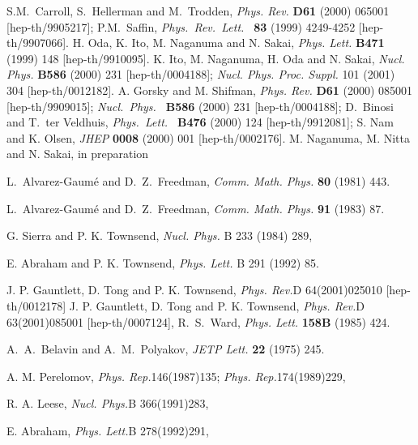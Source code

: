 \documentclass[a4paper,12pt]{article}
\begin{document}
\begin{thebibliography}{100}
              S.M.~Carroll, S.~Hellerman and M.~Trodden, 
              {\em Phys. Rev.} {\bf D61} (2000) 065001 
              [hep-th/9905217];
              P.M.~Saffin, {\it Phys.\ Rev.\ Lett.\ } {\bf 83} (1999) 
              4249-4252 [hep-th/9907066]. 
H. Oda, K. Ito, M. Naganuma and N. Sakai, 
              {\em Phys. Lett.} {\bf B471} (1999) 148 
              [hep-th/9910095]. 
 K. Ito, M. Naganuma, H. Oda and N. Sakai, 
              {\em Nucl. Phys.} {\bf B586} (2000) 231 
              [hep-th/0004188]; 
             {\em Nucl. Phys. Proc. Suppl.} {101} (2001) 304 
               [hep-th/0012182].
 A. Gorsky and M. Shifman, 
              {\em Phys. Rev.} {\bf D61} 
              (2000) 085001 [hep-th/9909015];
             {\it Nucl.\ Phys.\ } {\bf B586} (2000) 231 
             [hep-th/0004188];
             D.~Binosi and T.~ter Veldhuis, 
             {\it Phys.\ Lett.\ } {\bf B476} (2000) 124 
             [hep-th/9912081];
             S. Nam and K. Olsen, {\em JHEP} {\bf 0008} 
             (2000) 001 [hep-th/0002176].
%
%
  M. Naganuma, M. Nitta and N. Sakai, 
            in preparation

L.~Alvarez-Gaum\'{e} and D.~Z.~Freedman, 
{\em Comm. Math. Phys.} {\bf 80} (1981) 443.

L.~Alvarez-Gaum\'{e} and D.~Z.~Freedman, 
{\em Comm. Math. Phys.} {\bf 91} (1983) 87.

 G. Sierra and P. K. Townsend,
           {\em Nucl. Phys.} {B 233} (1984) 289,
 
E. Abraham and P. K. Townsend, 
{\em Phys. Lett.} {B 291} (1992) 85.
 
J. P. Gauntlett, D. Tong and P. K. Townsend,
              {\em Phys. Rev.}{D 64}(2001)025010
               [hep-th/0012178]
J. P. Gauntlett, D. Tong and P. K. Townsend,
               {\em Phys. Rev.}{D 63}(2001)085001 
               [hep-th/0007124],
R.~S.~Ward, 
{\em Phys. Lett. } {\bf 158B} (1985) 424.

A.~A.~Belavin and A.~M.~Polyakov, 
{\em JETP Lett.} {\bf 22} (1975) 245. 

A. M. Perelomov,
               {\em Phys. Rep.}{146}(1987)135; 
               {\em Phys. Rep.}{174}(1989)229,

R. A. Leese,
              {\em Nucl. Phys.}{B 366}(1991)283,
 
E. Abraham, 
              {\em Phys. Lett.}{B 278}(1992)291,
 

\end{thebibliography}
\end{document}
